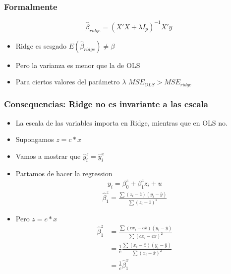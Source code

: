 \documentclass[
  shownotes,
  xcolor={svgnames},
  hyperref={colorlinks,citecolor=DarkBlue,linkcolor=andesred,urlcolor=DarkBlue}
  , aspectratio=169]{beamer}
\begin{document}
\begin{frame}[fragile]
\frametitle{Formalmente}
 \begin{equation*}
      \hat{\beta}_{ridge} = (X'X+\lambda I_p)^{-1} X' y
    \end{equation*}

\begin{itemize}
  \item Ridge es sesgado $E(\hat{\beta}_{ridge}) \neq \beta$
  \medskip
  \item Pero la varianza es menor que la de OLS
  \medskip
  \item Para ciertos valores del parámetro $\lambda$ $MSE_{OLS}>MSE_{ridge}$
\end{itemize}



\end{frame}
\begin{frame}[fragile]
\frametitle{Consequencias: Ridge no es invariante a las escala}
\begin{itemize}
  \item La escala de las variables importa en Ridge, mientras que en OLS no.
  \medskip
  \item Supongamos $z=c*x$
  \item Vamos a mostrar que $\hat{y}^z_{i}=\hat{y}^x_{i}$
  \item Partamos de hacer la regression
  \begin{align}
  y_{i}=\beta^z_{0}+\beta^z_{1}z_i+u
  \end{align}
  \begin{align}
  \hat{\beta}^z_{1} = \frac{\sum(z_{i}-\bar{z})(y_{i}-\bar{y})}{\sum(z_{i}-\bar{z})^{2}}
  \end{align}
  \item Pero $z=c*x$
  \begin{align}
  \hat{\beta}^z_{1} &= \frac{\sum(cx_{i}-c\bar{x})(y_{i}-\bar{y})}{\sum(cx_{i}-\bar{cx})^{2}} \\
                    &= \frac{1}{c}\frac{\sum(x_{i}-\bar{x})(y_{i}-\bar{y})}{\sum(x_{i}-\bar{x})^{2}} \\
                    &= \frac{1}{c}\hat{\beta}^x_1
  \end{align}

\end{itemize}
  \end{frame}
\end{document}
